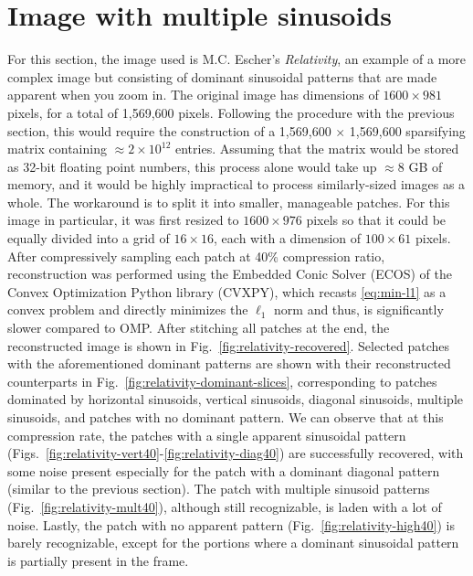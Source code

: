 \section{Image with multiple sinusoids}
\label{sec:2dmultisin}
For this section, the image used is M.C. Escher's \textit{Relativity}, an example of a more complex image but consisting of dominant sinusoidal patterns that are made apparent when you zoom in. The original image has dimensions of $1600 \times 981$ pixels, for a total of 1,569,600 pixels. Following the procedure with the previous section, this would require the construction of a 1,569,600 $\times$ 1,569,600 sparsifying matrix containing $\approx 2 \times 10^{12}$ entries. Assuming that the matrix would be stored as 32-bit floating point numbers, this process alone would take up $\approx 8$ GB of memory, and it would be highly impractical to process similarly-sized images as a whole. The workaround is to split it into smaller, manageable patches. For this image in particular, it was first resized to $1600 \times 976$ pixels so that it could be equally divided into a grid of $16 \times 16$, each with a dimension of $100 \times 61$ pixels. After compressively sampling each patch at 40\% compression ratio, reconstruction was performed using the Embedded Conic Solver (ECOS) of the Convex Optimization Python library (CVXPY), which recasts \eqref{eq:min-l1} as a convex problem and directly minimizes the $\ell_1$ norm \cite{ecos,cvxpy,cvxpy_rewriting} and thus, is significantly slower compared to OMP. After stitching all patches at the end, the reconstructed image is shown in Fig.~\ref{fig:relativity-recovered}. Selected patches with the aforementioned dominant patterns are shown with their reconstructed counterparts in Fig.~\ref{fig:relativity-dominant-slices}, corresponding to patches dominated by horizontal sinusoids, vertical sinusoids, diagonal sinusoids, multiple sinusoids, and patches with no dominant pattern. We can observe that at this compression rate, the patches with a single apparent sinusoidal pattern (Figs.~\ref{fig:relativity-vert40}-\ref{fig:relativity-diag40}) are successfully recovered, with some noise present especially for the patch with a dominant diagonal pattern (similar to the previous section). The patch with multiple sinusoid patterns (Fig.~\ref{fig:relativity-mult40}), although still recognizable, is laden with a lot of noise. Lastly, the patch with no apparent pattern (Fig.~\ref{fig:relativity-high40}) is barely recognizable, except for the portions where a dominant sinusoidal pattern is partially present in the frame.

